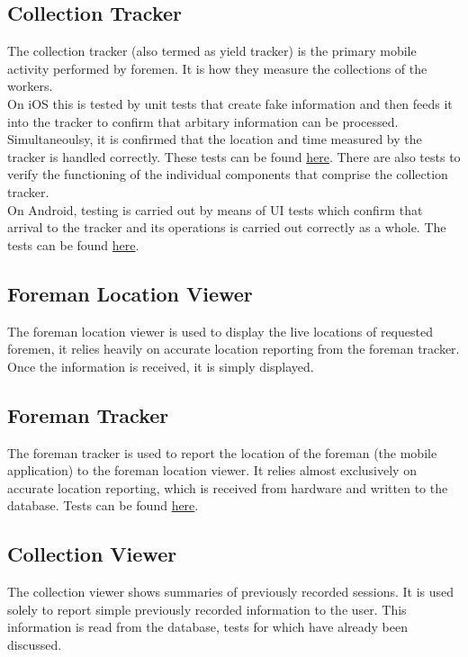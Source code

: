\documentclass[12pt]{article}
\begin{document}
\subsection{Collection Tracker}
The collection tracker (also termed as yield tracker) is the primary mobile activity performed by foremen. It is how they measure the collections of the workers.\\
\indent On iOS this is tested by unit tests that create fake information and then feeds it into the tracker to confirm that arbitary information can be processed. Simultaneoulsy, it is confirmed that the location and time measured by the tracker is handled correctly. These tests can be found \href{https://github.com/BinaryNinjaz/COS301-Capstone/blob/iOS-/Source/master/Harvest/HarvestTests/HarvestTests.swift}{here}. There are also tests to verify the functioning of the individual components that comprise the collection tracker.\\
\indent On Android, testing is carried out by means of UI tests which confirm that arrival to the tracker and its operations is carried out correctly as a whole. The tests can be found \href{https://github.com/BinaryNinjaz/COS301-Capstone/blob/master/Source/Android/Harvest/app/src/androidTest/java/za/org/samac/harvest/YieldTrackerTest.java}{here}.
\subsection{Foreman Location Viewer}
The foreman location viewer is used to display the live locations of requested foremen, it relies heavily on accurate location reporting from the foreman tracker. Once the information is received, it is simply displayed.
\subsection{Foreman Tracker}
The foreman tracker is used to report the location of the foreman (the mobile application) to the foreman location viewer. It relies almost exclusively on accurate location reporting, which is received from hardware and written to the database. Tests can be found \href{https://github.com/BinaryNinjaz/COS301-Capstone/blob/master/Source/iOS/Harvest/HarvestTests/GeoKitTests.swift}{here}.
\subsection{Collection Viewer}
The collection viewer shows summaries of previously recorded sessions. It is used solely to report simple previously recorded information to the user. This information is read from the database, tests for which have already been discussed.
\end{document}
